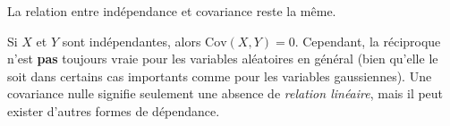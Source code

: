 La relation entre indépendance et covariance reste la même.

\begin{remarquebox}
Si $X$ et $Y$ sont indépendantes, alors $\text{Cov}(X, Y) = 0$. Cependant, la réciproque n'est \textbf{pas} toujours vraie pour les variables aléatoires en général (bien qu'elle le soit dans certains cas importants comme pour les variables gaussiennes). Une covariance nulle signifie seulement une absence de \textit{relation linéaire}, mais il peut exister d'autres formes de dépendance.
\end{remarquebox}